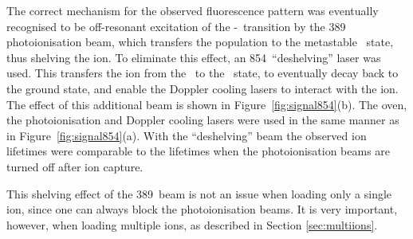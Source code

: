 The correct mechanism for the observed fluorescence pattern was eventually  recognised to be off-resonant excitation of the \soh-\pth\, transition by the 389\nm\, photoionisation beam, which transfers the population to the metastable \dfh\, state, thus shelving the ion. To eliminate this effect, an 854\nm\, ``deshelving'' laser was used. This transfers the ion from the \dfh\, to the \pth\, state, to eventually decay back to the ground state, and enable the Doppler cooling lasers to interact with the ion. The effect of this additional beam is shown in Figure~\ref{fig:signal854}(b). The \CaI{} oven, the photoionisation and Doppler cooling lasers were used in the same manner as in Figure~\ref{fig:signal854}(a). With the ``deshelving'' beam the observed ion lifetimes were comparable to the lifetimes when the photoionisation beams are turned off after ion capture.

This shelving effect of the 389\nm\, beam is not an issue when loading only a single ion, since one can always block the photoionisation beams. It is very important, however, when loading multiple ions, as described in Section \ref{sec:multiions}.


%

